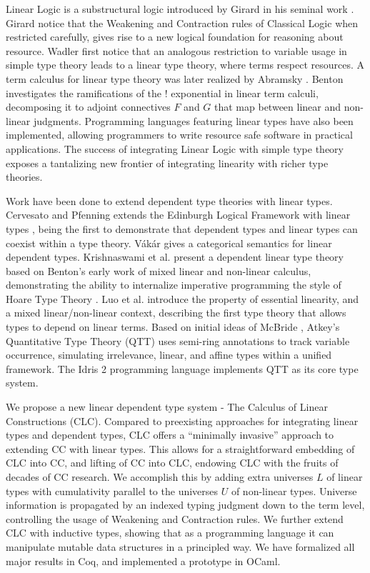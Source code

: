 \documentclass{article}
\begin{document}
  Linear Logic is a substructural logic introduced by Girard in his seminal work \cite{girard}. Girard notice that the Weakening and Contraction rules of Classical Logic when restricted carefully, gives rise to a new logical foundation for reasoning about resource. Wadler \cite{wadler1990,wadler1991} first notice that an analogous restriction to variable usage in simple type theory leads to a linear type theory, where terms respect resources. A term calculus for linear type theory was later realized by Abramsky \cite{abramsky1993}. Benton \cite{benton1994} investigates the ramifications of the ! exponential in linear term calculi, decomposing it to adjoint connectives $F$ and $G$ that map between linear and non-linear judgments. Programming languages \cite{l3,ats,linear-haskell} featuring linear types have also been implemented, allowing programmers to write resource safe software in practical applications. The success of integrating Linear Logic with simple type theory exposes a tantalizing new frontier of integrating linearity with richer type theories.

  Work have been done to extend dependent type theories with linear types. Cervesato and Pfenning extends the Edinburgh Logical Framework with linear types \cite{lf,llf}, being the first to demonstrate that dependent types and linear types can coexist within a type theory. V\'{a}k\'{a}r \cite{vakar14} gives a categorical semantics for linear dependent types.  Krishnaswami et al. present a dependent linear type theory \cite{neel15} based on Benton's early work of mixed linear and non-linear calculus, demonstrating the ability to internalize imperative programming the style of Hoare Type Theory \cite{htt}. Luo et al. introduce the property of essential linearity, and a mixed linear/non-linear context, describing the first type theory that allows types to depend on linear terms. Based on initial ideas of McBride \cite{nothing}, Atkey's Quantitative Type Theory (QTT) \cite{qtt} uses semi-ring annotations to track variable occurrence, simulating irrelevance, linear, and affine types within a unified framework. The Idris 2 programming language \cite{idris2} implements QTT as its core type system.

  We propose a new linear dependent type system - The Calculus of Linear Constructions (CLC). Compared to preexisting approaches for integrating linear types and dependent types, CLC offers a ``minimally invasive'' approach to extending CC with linear types. This allows for a straightforward embedding of CLC into CC, and lifting of CC into CLC, endowing CLC with the fruits of decades of CC research. We accomplish this by adding extra universes $L$ of linear types with cumulativity parallel to the universes $U$ of non-linear types. Universe information is propagated by an indexed typing judgment down to the term level, controlling the usage of Weakening and Contraction rules. We further extend CLC with inductive types, showing that as a programming language it can manipulate mutable data structures in a principled way. We have formalized all major results in Coq, and implemented a prototype in OCaml. 
\end{document}
